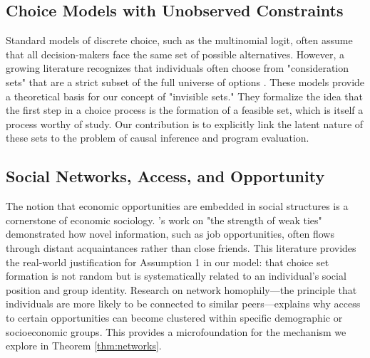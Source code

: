 \subsection{Choice Models with Unobserved Constraints}
Standard models of discrete choice, such as the multinomial logit, often assume that all decision-makers face the same set of possible alternatives. However, a growing literature recognizes that individuals often choose from "consideration sets" that are a strict subset of the full universe of options \citep{ExamplePaperOnConsiderationSets}.
These models provide a theoretical basis for our concept of "invisible sets." They formalize the idea that the first step in a choice process is the formation of a feasible set, which is itself a process worthy of study. Our contribution is to explicitly link the latent nature of these sets to the problem of causal inference and program evaluation.

\subsection{Social Networks, Access, and Opportunity}
The notion that economic opportunities are embedded in social structures is a cornerstone of economic sociology. \citet{Granovetter1973}'s work on "the strength of weak ties" demonstrated how novel information, such as job opportunities, often flows through distant acquaintances rather than close friends.
This literature provides the real-world justification for Assumption 1 in our model: that choice set formation is not random but is systematically related to an individual's social position and group identity. Research on network homophily—the principle that individuals are more likely to be connected to similar peers—explains why access to certain opportunities can become clustered within specific demographic or socioeconomic groups. This provides a microfoundation for the mechanism we explore in Theorem \ref{thm:networks}.

